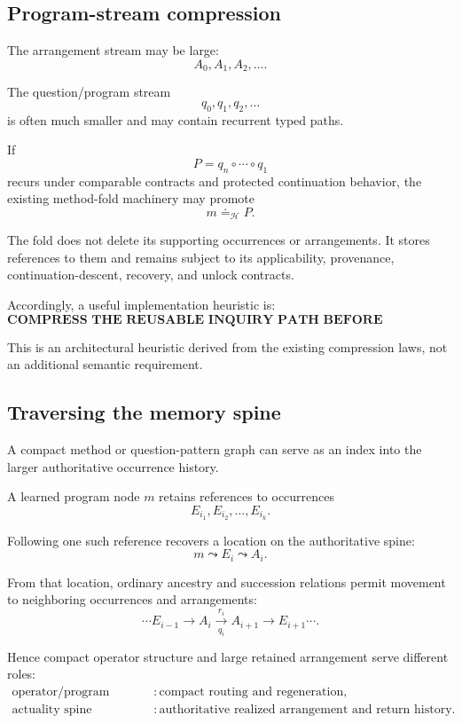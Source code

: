 \subsection{Program-stream compression}

The arrangement stream may be large:
\[
A_0,A_1,A_2,\ldots.
\]

The question/program stream
\[
q_0,q_1,q_2,\ldots
\]
is often much smaller and may contain recurrent typed paths.

If
\[
P=q_n\circ\cdots\circ q_1
\]
recurs under comparable contracts and protected continuation behavior, the
existing method-fold machinery may promote
\[
\boxed{
m\doteq_{\mathcal H}P.
}
\]

The fold does not delete its supporting occurrences or arrangements.  It
stores references to them and remains subject to its applicability,
provenance, continuation-descent, recovery, and unlock contracts.

Accordingly, a useful implementation heuristic is:
\[
\boxed{
\textbf{COMPRESS THE REUSABLE INQUIRY PATH BEFORE ATTEMPTING
DESTRUCTIVE COMPRESSION OF THE ARRANGEMENT IT TRAVERSED.}
}
\]

This is an architectural heuristic derived from the existing compression
laws, not an additional semantic requirement.

\subsection{Traversing the memory spine}

A compact method or question-pattern graph can serve as an index into the
larger authoritative occurrence history.

A learned program node \(m\) retains references to occurrences
\[
E_{i_1},E_{i_2},\ldots,E_{i_k}.
\]

Following one such reference recovers a location on the authoritative spine:
\[
m\leadsto E_i\leadsto A_i.
\]

From that location, ordinary ancestry and succession relations permit
movement to neighboring occurrences and arrangements:
\[
\cdots
E_{i-1}
\to
A_i
\xrightarrow[q_i]{r_i}
A_{i+1}
\to
E_{i+1}
\cdots.
\]

Hence compact operator structure and large retained arrangement serve
different roles:
\[
\boxed{
\begin{aligned}
\text{operator/program graph} &: \text{compact routing and regeneration},\\
\text{actuality spine} &: \text{authoritative realized arrangement and return history}.
\end{aligned}
}
\]

